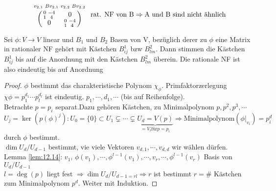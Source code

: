 \documentclass{mycourse}
\begin{document}
\begin{ex}
\[
 \begin{tabular}{c}$
 \begin{smallmatrix}v_{2,1}&Bv_{2,1}&v_{2,2}&Bv_{2,2}\end{smallmatrix}$\\
 $\begin{pmatrix}\begin{smallmatrix}0&-4\\1&4\end{smallmatrix}&0\\ 
 0&\begin{smallmatrix}0&-4\\1&4\end{smallmatrix}
 \end{pmatrix}$ 
 \end{tabular} \text{rat. NF von B} \Rightarrow \text{A und B sind nicht ähnlich}
 \]

\end{ex}
\begin{prop}
	\label{prop:12.18}
	  Sei $\phi:V\longrightarrow V$ linear und $B_1$ und $B_2$ Basen von V, bezüglich derer zu $\phi$ eine Matrix in rationaler NF gehört mit Kästchen $B^1_{ij}$ bzw $B^2_{lm}$. 
	  Dann stimmen  die Kästchen $B^1_{ij}$ bis auf die Anordnung mit den Kästchen $B^2_{lm}$ überein. Die rationale NF ist also eindeutig bis auf Anordnung
	  \begin{proof}
	   $\phi$ bestimmt das charakteristische Polynom $\chi_{\phi}$. Primfaktorzerlegung $\chi{\phi}=p_1^{d_1}\cdots p_l^{d_l}$ ist eindeutig.
	   $p_1,\cdots ,d_1,\cdots$ (bis auf Reihenfolge).\\
	   Betrachte $p=p_i$ separat.Dazu gehören Kästchen, zu Minimalpolynom $p,p^2,p^3,\cdots$\\
	   $U_j=\ker(p(\phi)^j):U_0=\{0\}\subset U_1\subsetneq \cdots \subsetneq \underbrace{U_d=V(p)}_{=V_i \text{für}p=p_i} \Rightarrow \text{Minimalpolynom}(\phi |_{v_i} %
	   )=p_i^d$ durch $\phi$ bestimmt.\\
	   $\dim U_d/U_{d-1}$ bestimmt, vie viele Vektoren $v_{d,1},\cdots ,v_{d,d}$ wir wählen dürfen.\\
	   Lemma \ref{lem:12.14}: $v_1$, $\phi(v_1),\cdots,\phi^{l-1}(v_1),\cdots,v_r,\cdots,\phi^{l-1}(v_r)$ Basis von $U_d/U_{d-1}$\\
	   $l=\deg(p)$ liegt fest $\Rightarrow \dim U_d/U_{d-1=rl} \Rightarrow r$ ist bestimmt $r=\#$ Kästchen zum Minimalpolynom $p^d$. Weiter mit Induktion.
	  \end{proof}
\end{prop}
\end{document}

